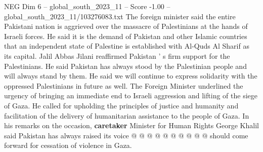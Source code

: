 \begin{textsample}{NEG Dim 6 – global\_south\_2023\_11 – Score -1.00 – global\_south\_2023\_11/103276083.txt}
The foreign minister said the entire Pakistani nation is aggrieved over the massacre of Palestinians at the hands of Israeli forces.
He said it is the demand of Pakistan and other Islamic countries that an independent state of Palestine is established with Al-Quds Al Sharif as its capital.
Jalil Abbas Jilani reaffirmed Pakistan ' s firm support for the Palestinians.
He said Pakistan has always stood by the Palestinian people and will always stand by them.
He said we will continue to express solidarity with the oppressed Palestinians in future as well.
The Foreign Minister underlined the urgency of bringing an immediate end to Israeli aggression and lifting of the siege of Gaza.
He called for upholding the principles of justice and humanity and facilitation of the delivery of humanitarian assistance to the people of Gaza.
In his remarks on the occasion, \textbf{caretaker} Minister for Human Rights George Khalil said Pakistan has always raised its voice @ @ @ @ @ @ @ @ @ @ should come forward for cessation of violence in Gaza.

\end{textsample}
